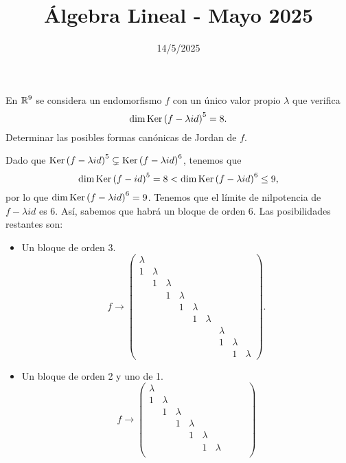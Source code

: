 \documentclass{article}
\begin{document}
\title{Álgebra Lineal - Mayo 2025}
\date{14/5/2025}

\maketitle

\begin{ej}
En $\displaystyle \mathbb{R}^{9} $ se considera un endomorfismo $\displaystyle f $ con un único valor propio $\displaystyle \lambda  $ que verifica
\[\dim \operatorname{Ker}\left(f - \lambda id\right)^{5} = 8 .\]
Determinar las posibles formas canónicas de Jordan de $\displaystyle f $.
\end{ej}
\begin{sol}
Dado que $\displaystyle \operatorname{Ker}\left(f - \lambda id\right)^{5} \subsetneq \operatorname{Ker}\left(f - \lambda id\right)^{6} $, tenemos que 
\[ \dim \operatorname{Ker}\left(f - id\right)^{5} = 8 < \dim \operatorname{Ker}\left(f - \lambda id\right)^{6} \leq 9, \]
por lo que $\displaystyle \dim \operatorname{Ker}\left(f -\lambda id\right)^{6} = 9 $. Tenemos que el límite de nilpotencia de $\displaystyle f - \lambda id $ es 6. Así, sabemos que habrá un bloque de orden 6. Las posibilidades restantes son:
\begin{itemize}
\item Un bloque de orden 3.
	\[f \to \begin{pmatrix} \lambda & & & & & & & & \\
		1 & \lambda & & & & & & & \\
	  & 1 & \lambda & & & & & &\\
	  & & 1 & \lambda & & & & & \\
	  & & & 1 & \lambda & & & & \\
	  & & & & 1 & \lambda & & & \\
	  & & & & & & \lambda & & \\
	  & & & & & & 1 & \lambda & \\
	  & & & & & & & 1 & \lambda\end{pmatrix} .\]
\item Un bloque de orden 2 y uno de 1.
	\[f \to \begin{pmatrix} \lambda & & & & & & & & \\
		1 & \lambda & & & & & & & \\
	  & 1 & \lambda & & & & & &\\
	  & & 1 & \lambda & & & & & \\
	  & & & 1 & \lambda & & & & \\
	  & & & & 1 & \lambda & & & \\

\end{pmatrix}\]
\end{itemize}
\end{sol}
\end{document}
